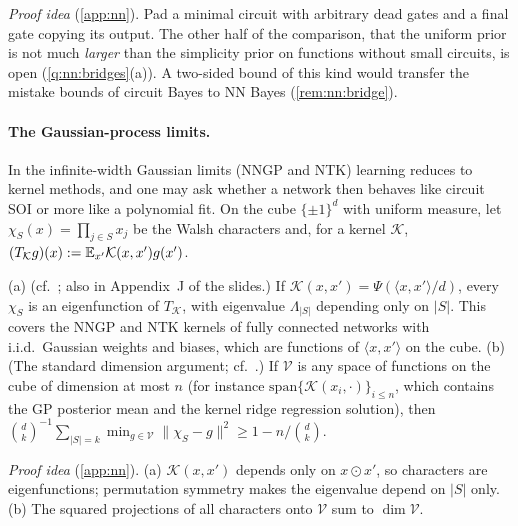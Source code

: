 \emph{Proof idea} (\cref{app:nn}). Pad a minimal circuit with arbitrary dead gates and a final gate copying its output. The other half of the comparison, that the uniform prior is not much \emph{larger} than the simplicity prior on functions without small circuits, is open (\cref{q:nn:bridges}(a)). A two-sided bound of this kind would transfer the mistake bounds of circuit Bayes to NN Bayes (\cref{rem:nn:bridge}).

\paragraph{The Gaussian-process limits.} In the infinite-width Gaussian limits (NNGP and NTK) learning reduces to kernel methods, and one may ask whether a network then behaves like circuit SOI or more like a polynomial fit. On the cube $\{\pm1\}^d$ with uniform measure, let $\chi_S(x)=\prod_{j\in S}x_j$ be the Walsh characters and, for a kernel $\mathcal K$, $(T_{\mathcal K}g)(x):=\mathbb{E}_{x'}\mathcal K(x,x')g(x')$.

\begin{theorem}\label{thm:nn:walsh}
(a) (cf.\ \citealp{yang2019fine}; also in Appendix~J of the slides.) If $\mathcal K(x,x')=\Psi(\langle x,x'\rangle/d)$, every $\chi_S$ is an eigenfunction of $T_{\mathcal K}$, with eigenvalue $\Lambda_{|S|}$ depending only on $|S|$. This covers the NNGP and NTK kernels of fully connected networks with i.i.d.\ Gaussian weights and biases, which are functions of $\langle x,x'\rangle$ on the cube.
(b) (The standard dimension argument; cf.\ \citealp{kamath2020approximate}.) If $\mathcal V$ is any space of functions on the cube of dimension at most $n$ (for instance $\mathrm{span}\{\mathcal K(x_i,\cdot)\}_{i\le n}$, which contains the GP posterior mean and the kernel ridge regression solution), then $\binom dk^{-1}\sum_{|S|=k}\min_{g\in\mathcal V}\|\chi_S-g\|^2\ge1-n/\binom dk$.
\end{theorem}

\emph{Proof idea} (\cref{app:nn}). (a) $\mathcal K(x,x')$ depends only on $x\odot x'$, so characters are eigenfunctions; permutation symmetry makes the eigenvalue depend on $|S|$ only. (b) The squared projections of all characters onto $\mathcal V$ sum to $\dim\mathcal V$.

